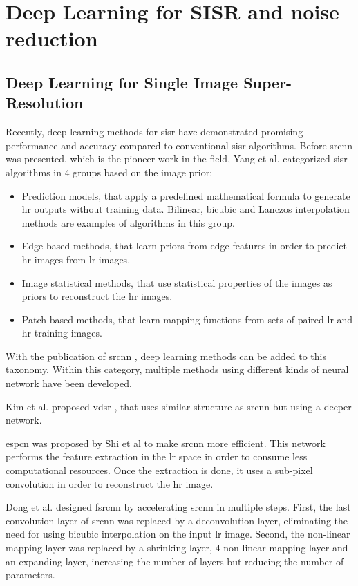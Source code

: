 \section{Deep Learning for SISR and noise reduction}\label{sec:deep_learning}

\subsection{Deep Learning for Single Image Super-Resolution}
Recently, deep learning methods for \gls{sisr} have demonstrated promising performance and accuracy compared to conventional \gls{sisr} algorithms. Before \gls{srcnn} \cite{SRCNN} was presented, which is the pioneer work in the field, Yang et al. \cite{SISRBENCH} categorized \gls{sisr} algorithms in 4 groups based on the image prior:
\begin{itemize}
	\item Prediction models, that apply a predefined mathematical formula to generate \gls{hr} outputs without training data. Bilinear, bicubic and Lanczos interpolation methods are examples of algorithms in this group.
	\item Edge based methods, that learn priors from edge features in order to predict \gls{hr} images from \gls{lr} images.
	\item Image statistical methods, that use statistical properties of the images as priors to reconstruct the \gls{hr} images.
	\item Patch based methods, that learn mapping functions from sets of paired \gls{lr} and \gls{hr} training images.
\end{itemize}

With the publication of \gls{srcnn} \cite{SRCNN}, deep learning methods can be added to this taxonomy. Within this category, multiple methods using different kinds of neural network have been developed. 

Kim et al. proposed \gls{vdsr} \cite{VDSR}, that uses similar structure as \gls{srcnn} but using a deeper network.

\gls{espcn} \cite{ESPCN} was proposed by Shi et al to make \gls{srcnn} more efficient. This network performs the feature extraction in the \gls{lr} space in order to consume less computational resources. Once the extraction is done, it uses a sub-pixel convolution in order to reconstruct the \gls{hr} image.

Dong et al. designed \gls{fsrcnn} \cite{FSRCNN} by accelerating \gls{srcnn} \cite{SRCNN} in multiple steps. First, the last convolution layer of \gls{srcnn} was replaced by a deconvolution layer, eliminating the need for using bicubic interpolation on the input \gls{lr} image. Second, the non-linear mapping layer was replaced by a shrinking layer, 4 non-linear mapping layer and an expanding layer, increasing the number of layers but reducing the number of parameters.

